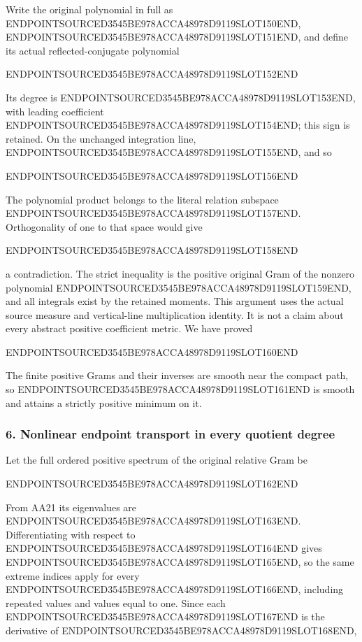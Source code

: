 Write the original polynomial in full as ENDPOINTSOURCED3545BE978ACCA48978D9119SLOT150END, ENDPOINTSOURCED3545BE978ACCA48978D9119SLOT151END, and define its actual reflected-conjugate polynomial

ENDPOINTSOURCED3545BE978ACCA48978D9119SLOT152END

Its degree is ENDPOINTSOURCED3545BE978ACCA48978D9119SLOT153END, with leading coefficient ENDPOINTSOURCED3545BE978ACCA48978D9119SLOT154END; this sign is retained. On the unchanged integration line, ENDPOINTSOURCED3545BE978ACCA48978D9119SLOT155END, and so

ENDPOINTSOURCED3545BE978ACCA48978D9119SLOT156END

The polynomial product belongs to the literal relation subspace ENDPOINTSOURCED3545BE978ACCA48978D9119SLOT157END. Orthogonality of one to that space would give

ENDPOINTSOURCED3545BE978ACCA48978D9119SLOT158END

a contradiction. The strict inequality is the positive original Gram of the nonzero polynomial ENDPOINTSOURCED3545BE978ACCA48978D9119SLOT159END, and all integrals exist by the retained moments. This argument uses the actual source measure and vertical-line multiplication identity. It is not a claim about every abstract positive coefficient metric. We have proved

ENDPOINTSOURCED3545BE978ACCA48978D9119SLOT160END

The finite positive Grams and their inverses are smooth near the compact path, so ENDPOINTSOURCED3545BE978ACCA48978D9119SLOT161END is smooth and attains a strictly positive minimum on it.

\subsubsection{6. Nonlinear endpoint transport in every quotient degree}\label{endpoint-all_degree_angle_review--nonlinear-endpoint-transport-in-every-quotient-degree}

Let the full ordered positive spectrum of the original relative Gram be

ENDPOINTSOURCED3545BE978ACCA48978D9119SLOT162END

From AA21 its eigenvalues are ENDPOINTSOURCED3545BE978ACCA48978D9119SLOT163END. Differentiating with respect to ENDPOINTSOURCED3545BE978ACCA48978D9119SLOT164END gives ENDPOINTSOURCED3545BE978ACCA48978D9119SLOT165END, so the same extreme indices apply for every ENDPOINTSOURCED3545BE978ACCA48978D9119SLOT166END, including repeated values and values equal to one. Since each ENDPOINTSOURCED3545BE978ACCA48978D9119SLOT167END is the derivative of ENDPOINTSOURCED3545BE978ACCA48978D9119SLOT168END,

